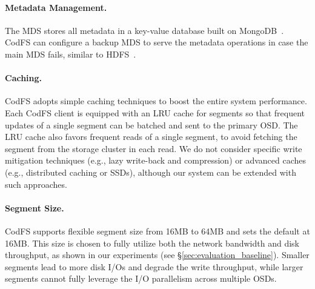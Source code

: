 \paragraph{Metadata Management.} The MDS stores all metadata in a
key-value database built on MongoDB~\cite{mongodb}. CodFS can configure a
backup MDS to serve the metadata operations in case the main MDS fails,
similar to HDFS~\cite{hdfs_architecture}. 

\paragraph{Caching.} CodFS adopts simple caching techniques to boost the entire
system performance.  Each CodFS client is equipped with an LRU cache for
segments so that frequent updates of a single segment can be batched and sent
to the primary OSD. 
The LRU cache also favors frequent reads of a single segment, to avoid
fetching the segment from the storage cluster in each read.  We do not
consider specific write mitigation techniques (e.g., lazy write-back and
compression) or advanced caches (e.g., distributed caching or SSDs), although
our system can be extended with such approaches. 


\paragraph{Segment Size.} CodFS supports flexible segment size from
16MB to 64MB and sets the default at 16MB. This size is chosen to fully
utilize both the network bandwidth and disk throughput, as shown in our 
experiments (see \S\ref{sec:evaluation_baseline}). Smaller segments
lead to more disk I/Os and degrade the write throughput, while larger 
segments cannot fully leverage the I/O parallelism across multiple OSDs. 


\setlength\abovecaptionskip{10pt}
\setlength\belowcaptionskip{0pt}
